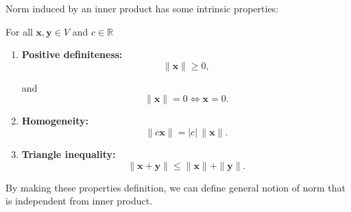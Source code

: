 \begin{proposition}
	Norm induced by an inner product has some intrinsic properties:

	For all \( \mathbf{x}, \mathbf{y} \in V \) and \( c \in \mathbb{R} \)

	\begin{enumerate}
		\item \textbf{Positive definiteness:}
		      \begin{equation}
			      \|\mathbf{x}\|\geq 0,
			      \label{eq:inner-product-6}
		      \end{equation}

		      and
		      \begin{equation}
			      \|\mathbf{x}\|=0 \iff \mathbf{x}=0.
			      \label{eq:inner-product-7}
		      \end{equation}

		\item \textbf{Homogeneity:}
		      \begin{equation}
			      \|c\mathbf{x}\|=|c|\,\|\mathbf{x}\|.
			      \label{eq:inner-product-8}
		      \end{equation}

		\item \textbf{Triangle inequality:}
		      \begin{equation}
			      \|\mathbf{x}+\mathbf{y}\|\leq \|\mathbf{x}\|+\|\mathbf{y}\|.
			      \label{eq:inner-product-9}
		      \end{equation}
	\end{enumerate}
\end{proposition}

By making these properties definition, we can define general notion of norm that is independent from inner product.

